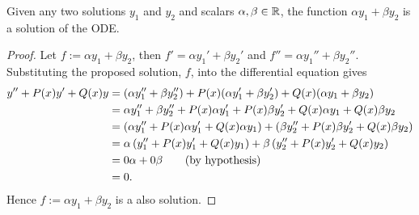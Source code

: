 Given any two solutions $y_1$ and $y_2$ and scalars $\alpha, \beta \in \mathbb{R}$, the function 
$\alpha y_1 + \beta y_2$ is a solution of the ODE.

\begin{proof}
    Let $f := \alpha y_1 + \beta y_2$, then $f' = \alpha y_1' + \beta y_2'$ and $f'' = \alpha y_1'' + \beta y_2''$.
    Substituting the proposed solution, $f$, into the differential equation gives
    \begin{align*}
        y'' + P(x)y' + Q(x)y &= (\alpha y_1'' + \beta y_2'') + P(x) (\alpha y_1' + \beta y_2') + Q(x) (\alpha y_1 + \beta y_2)\\
        &= \alpha y_1'' + \beta y_2'' + P(x) \alpha y_1' + P(x)\beta y_2' + Q(x) \alpha y_1 + Q(x) \beta y_2\\
        &= \pars{\alpha y_1'' + P(x) \alpha y_1' + Q(x) \alpha y_1} + \pars{
            \beta y_2'' + P(x)\beta y_2' + Q(x) \beta y_2
        }\\
        &= \alpha \pars{ y_1'' + P(x)  y_1' + Q(x)  y_1} + \beta \pars{ y_2'' + P(x) y_2' + Q(x)  y_2}\\
        &= 0\alpha + 0\beta \tag{by hypothesis}\\
        &= 0.
    \end{align*}
    Hence $f := \alpha y_1 + \beta y_2$ is a also solution.
\end{proof}